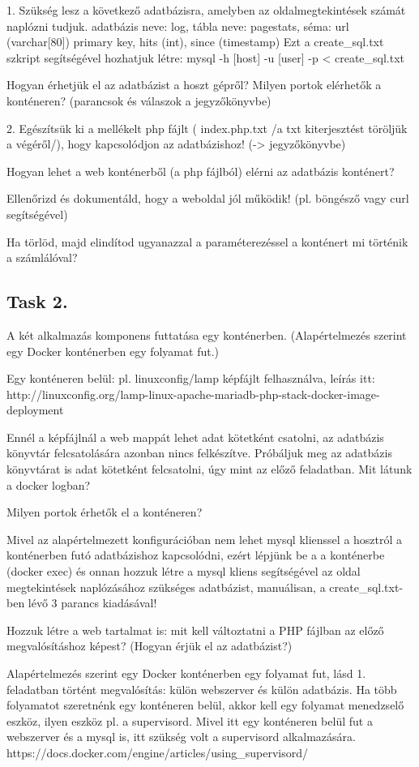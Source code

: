 \documentclass[a4paper]{article}
\begin{document}
1. Szükség lesz a következő adatbázisra, amelyben az oldalmegtekintések számát naplózni tudjuk. adatbázis neve: log, tábla neve: pagestats, séma: url (varchar[80]) primary key, hits (int), since (timestamp) Ezt a create_sql.txt szkript segítségével hozhatjuk létre:
mysql -h [host] -u [user] -p < create_sql.txt

Hogyan érhetjük el az adatbázist a hoszt gépről? Milyen portok elérhetők a konténeren? (parancsok és válaszok a jegyzőkönyvbe)

2. Egészítsük ki a mellékelt php fájlt ( index.php.txt /a txt kiterjesztést töröljük a végéről/), hogy kapcsolódjon az adatbázishoz! (-> jegyzőkönyvbe)

Hogyan lehet a web konténerből (a php fájlból) elérni az adatbázis konténert?

Ellenőrizd és dokumentáld, hogy a weboldal jól működik! (pl. böngésző vagy curl segítségével)

Ha törlöd, majd elindítod ugyanazzal a paraméterezéssel a konténert mi történik a számlálóval? 

\subsection{Task 2.}
A két alkalmazás komponens futtatása egy konténerben. (Alapértelmezés szerint egy Docker konténerben egy folyamat fut.)

Egy konténeren belül: pl. linuxconfig/lamp képfájlt felhasználva, leírás itt: http://linuxconfig.org/lamp-linux-apache-mariadb-php-stack-docker-image-deployment

Ennél a képfájlnál a web mappát lehet adat kötetként csatolni, az adatbázis könyvtár felcsatolására azonban nincs felkészítve. Próbáljuk meg az adatbázis könyvtárat is adat kötetként felcsatolni, úgy mint az előző feladatban. Mit látunk a docker logban?

Milyen portok érhetők el a konténeren?

Mivel az alapértelmezett konfigurációban nem lehet mysql klienssel a hosztról a konténerben futó adatbázishoz kapcsolódni, ezért lépjünk be a a konténerbe (docker exec) és onnan hozzuk létre a mysql kliens segítségével az oldal megtekintések naplózásához szükséges adatbázist, manuálisan, a create_sql.txt-ben lévő 3 parancs kiadásával!

Hozzuk létre a web tartalmat is: mit kell változtatni a PHP fájlban az előző megvalósításhoz képest? (Hogyan érjük el az adatbázist?)

Alapértelmezés szerint egy Docker konténerben egy folyamat fut, lásd 1. feladatban történt megvalósítás: külön webszerver és külön adatbázis. Ha több folyamatot szeretnénk egy konténeren belül, akkor kell egy folyamat menedzselő eszköz, ilyen eszköz pl. a supervisord. Mivel itt egy konténeren belül fut a webszerver és a mysql is, itt szükség volt a supervisord alkalmazására. https://docs.docker.com/engine/articles/using_supervisord/
\end{document}
